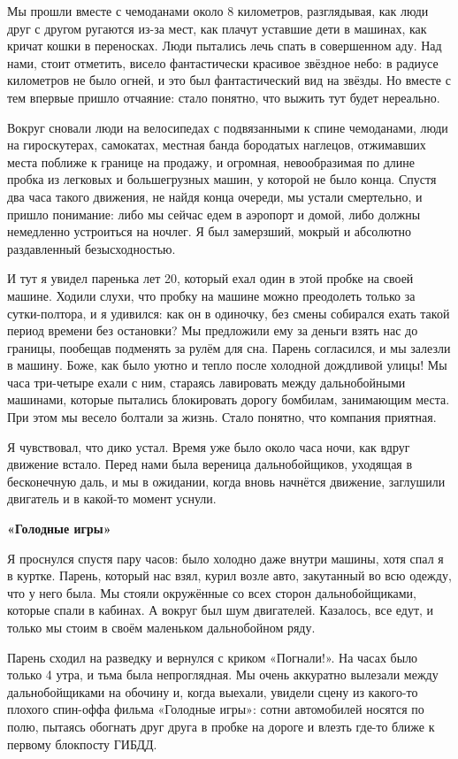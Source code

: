 Мы прошли вместе с чемоданами около 8 километров, разглядывая, как люди друг с другом ругаются из-за мест, как плачут уставшие дети в машинах, как кричат кошки в переносках. Люди пытались лечь спать в совершенном аду. Над нами, стоит отметить, висело фантастически красивое звёздное небо: в радиусе километров не было огней, и это был фантастический вид на звёзды. Но вместе с тем впервые пришло отчаяние: стало понятно, что выжить тут будет нереально.

Вокруг сновали люди на велосипедах с подвязанными к спине чемоданами, люди на гироскутерах, самокатах, местная банда бородатых наглецов, отжимавших места поближе к границе на продажу, и огромная, невообразимая по длине пробка из легковых и большегрузных машин, у которой не было конца. Спустя два часа такого движения, не найдя конца очереди, мы устали смертельно, и пришло понимание: либо мы сейчас едем в аэропорт и домой, либо должны немедленно устроиться на ночлег. Я был замерзший, мокрый и абсолютно раздавленный безысходностью.

И тут я увидел паренька лет 20, который ехал один в этой пробке на своей машине. Ходили слухи, что пробку на машине можно преодолеть только за сутки-полтора, и я удивился: как он в одиночку, без смены собирался ехать такой период времени без остановки? Мы предложили ему за деньги взять нас до границы, пообещав подменять за рулём для сна. Парень согласился, и мы залезли в машину. Боже, как было уютно и тепло после холодной дождливой улицы! Мы часа три-четыре ехали с ним, стараясь лавировать между дальнобойными машинами, которые пытались блокировать дорогу бомбилам, занимающим места. При этом мы весело болтали за жизнь. Стало понятно, что компания приятная.

Я чувствовал, что дико устал. Время уже было около часа ночи, как вдруг движение встало. Перед нами была вереница дальнобойщиков, уходящая в бесконечную даль, и мы в ожидании, когда вновь начнётся движение, заглушили двигатель и в какой-то момент уснули.


\textbf{«Голодные игры»}

Я проснулся спустя пару часов: было холодно даже внутри машины, хотя спал я в куртке. Парень, который нас взял, курил возле авто, закутанный во всю одежду, что у него была. Мы стояли окружённые со всех сторон дальнобойщиками, которые спали в кабинах. А вокруг был шум двигателей. Казалось, все едут, и только мы стоим в своём маленьком дальнобойном ряду.

Парень сходил на разведку и вернулся с криком «Погнали!». На часах было только 4 утра, и тьма была непроглядная. Мы очень аккуратно вылезали между дальнобойщиками на обочину и, когда выехали, увидели сцену из какого-то плохого спин-оффа фильма «Голодные игры»: сотни автомобилей носятся по полю, пытаясь обогнать друг друга в пробке на дороге и влезть где-то ближе к первому блокпосту ГИБДД.

